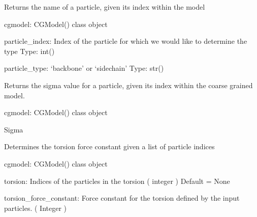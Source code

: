 \documentclass[letterpaper,12pt,english,openany,oneside]{sphinxmanual}
\begin{document}

\begin{fulllineitems}
\label{\detokenize{cg_model:cg_model.cgmodel.get_particle_type}}
Returns the name of a particle, given its index within the model

cgmodel: CGModel() class object

particle\_index: Index of the particle for which we would like to determine the type
Type: int()

particle\_type: ‘backbone’ or ‘sidechain’
Type: str()

\end{fulllineitems}


\begin{fulllineitems}
\label{\detokenize{cg_model:cg_model.cgmodel.get_sigma}}
Returns the sigma value for a particle, given its index within the coarse grained model.

cgmodel: CGModel() class object

Sigma

\end{fulllineitems}


\begin{fulllineitems}
\label{\detokenize{cg_model:cg_model.cgmodel.get_torsion_force_constant}}
Determines the torsion force constant given a list of particle indices

cgmodel: CGModel() class object

torsion: Indices of the particles in the torsion
( integer )
Default = None

torsion\_force\_constant: Force constant for the torsion defined by the input particles.
( Integer )

\end{fulllineitems}
\end{document}
